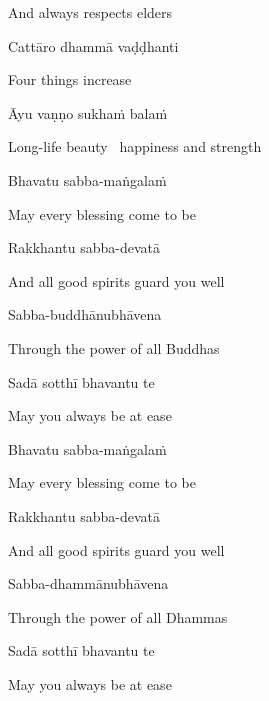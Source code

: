 \begin{english}
  And always respects elders
\end{english}

Cattāro dhammā vaḍḍhanti

\begin{english}
  Four things increase
\end{english}

Āyu vaṇṇo sukhaṁ balaṁ

\begin{english}
  Long-life beauty \breathmark\ happiness and strength
\end{english}

Bhavatu sabba-maṅgalaṁ

\begin{english}
  May every blessing come to be
\end{english}

Rakkhantu sabba-devatā

\begin{english}
  And all good spirits guard you well
\end{english}

Sabba-buddhānubhāvena

\begin{english}
  Through the power of all Buddhas
\end{english}

Sadā sotthī bhavantu te

\begin{english}
  May you always be at ease
\end{english}

Bhavatu sabba-maṅgalaṁ

\begin{english}
  May every blessing come to be
\end{english}

Rakkhantu sabba-devatā

\begin{english}
  And all good spirits guard you well
\end{english}

Sabba-dhammānubhāvena

\begin{english}
  Through the power of all Dhammas
\end{english}

Sadā sotthī bhavantu te

\begin{english}
  May you always be at ease
\end{english}

